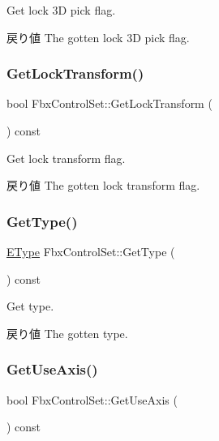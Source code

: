 Get lock 3D pick flag. \begin{DoxyReturn}{戻り値}
The gotten lock 3D pick flag. 
\end{DoxyReturn}
\mbox{\label{class_fbx_control_set_abdf5c1365c3d92536acb96710b8b51d6}} 
\subsubsection{\texorpdfstring{Get\+Lock\+Transform()}{GetLockTransform()}}
{\footnotesize\ttfamily bool Fbx\+Control\+Set\+::\+Get\+Lock\+Transform (\begin{DoxyParamCaption}{ }\end{DoxyParamCaption}) const}

Get lock transform flag. \begin{DoxyReturn}{戻り値}
The gotten lock transform flag. 
\end{DoxyReturn}
\mbox{\label{class_fbx_control_set_abbd6f5ed53232644c148dd662f23ef8b}} 
\subsubsection{\texorpdfstring{Get\+Type()}{GetType()}}
{\footnotesize\ttfamily \hyperlink{class_fbx_control_set_a13a51702c46fff33d50c05d20f3d9f04}{E\+Type} Fbx\+Control\+Set\+::\+Get\+Type (\begin{DoxyParamCaption}{ }\end{DoxyParamCaption}) const}

Get type. \begin{DoxyReturn}{戻り値}
The gotten type. 
\end{DoxyReturn}
\mbox{\label{class_fbx_control_set_a34b3a19fbef7931ea1ee8454063bbd2b}} 
\subsubsection{\texorpdfstring{Get\+Use\+Axis()}{GetUseAxis()}}
{\footnotesize\ttfamily bool Fbx\+Control\+Set\+::\+Get\+Use\+Axis (\begin{DoxyParamCaption}{ }\end{DoxyParamCaption}) const}

